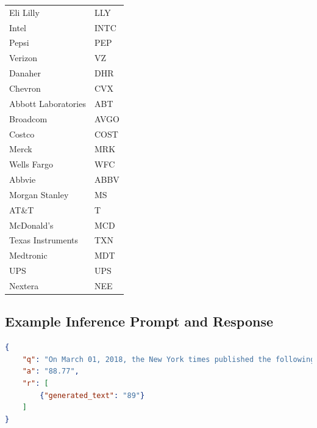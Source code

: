 \documentclass[conference]{IEEEtran}
\begin{document}
\begin{singlespace}
\begin{Center}
\begin{table}[H]
\begin{tabular}{|l|l|}
    Eli Lilly & LLY \\
    Intel & INTC \\
    Pepsi & PEP \\
    Verizon & VZ \\
    Danaher & DHR \\
    Chevron & CVX \\
    Abbott Laboratories & ABT \\
    Broadcom & AVGO \\
    Costco & COST \\
    Merck & MRK \\
    Wells Fargo & WFC \\
    Abbvie & ABBV \\
    Morgan Stanley & MS \\
    AT\&T & T \\
    McDonald's & MCD \\
    Texas Instruments & TXN \\
    Medtronic & MDT \\
    UPS & UPS \\
    Nextera & NEE \\
    \hline
\end{tabular}
\label{table:stockSources}
\end{table}

\subsection{Example Inference Prompt and Response}
\label{Examples}
\begin{lstlisting}[language=json,firstnumber=1]
{
	"q": "On March 01, 2018, the New York times published the following article regarding Walmart(Ticker: WMT) from their Business news desk. Headline: Walmart to Raise Age to Buy Guns and Ammunition to 21. Lead paragraph: Walmart, the largest retailer in the United States, said Wednesday evening that it would stop selling guns and ammunition to anyone under 21 years of age and remove from its stores all toys and airsoft rifles that resemble assault-style weapons. When the news of this was released, past stock prices were: $92.77, $92.89, $93.12, $91.52, $90.01, $89.08. After this news was announced, the following day's price was: $",
	"a": "88.77",
	"r": [
		{"generated_text": "89"}
	]
}
\end{lstlisting}
\end{Center}
\end{singlespace}
\end{document}
